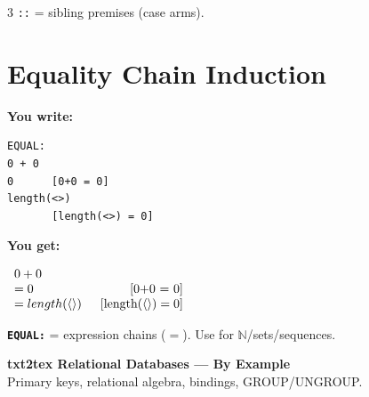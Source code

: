 \documentclass[10pt,landscape,a4paper]{article}
\newcommand{\kw}[1]{\texttt{\bfseries #1}}
\newenvironment{exwrite}%
  {\par\noindent\scriptsize\textbf{You write:}\par\vspace{0pt}\scriptsize}%
  {\vspace{1pt}}
\newenvironment{exget}%
  {\par\noindent\scriptsize\textbf{You get:}\par\vspace{0pt}\small}%
  {\par\vspace{3pt}}
\begin{document}
\begin{multicols}{3}
{\scriptsize \texttt{::} = sibling premises (case arms).}


\section{Equality Chain {\normalsize\color{gray}\textrm{\scriptsize Induction}}}

\begin{exwrite}%
\begin{verbatim}
EQUAL:
0 + 0
0      [0+0 = 0]
length(<>)
       [length(<>) = 0]
\end{verbatim}
\end{exwrite}
\begin{exget}%
\begin{center}
$\begin{array}{l@{\hspace{1.5em}}r}
0 + 0 \\
= 0 & [\mbox{0+0 = 0}] \\
= length(\langle\rangle) & [\mbox{length}(\langle\rangle) = 0]
\end{array}$
\end{center}
\end{exget}

{\scriptsize \kw{EQUAL:} = expression chains ($=$). Use for $\mathbb{N}$/sets/sequences.}

\end{multicols}

\newpage

\begin{center}
{\LARGE\bfseries txt2tex Relational Databases --- By Example}\\[2pt]
{\small Primary keys, relational algebra, bindings, GROUP/UNGROUP.}
\end{center}

\vspace{-2pt}
\end{document}
